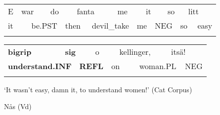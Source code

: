 \begin{tabular}{llllllllllllllll}
\lsptoprule
E & \multicolumn{2}{l}{war

} & \multicolumn{2}{l}{do

} & \multicolumn{2}{l}{fanta

} & \multicolumn{2}{l}{me

} & \multicolumn{2}{l}{it

} & \multicolumn{2}{l}{so

} & \multicolumn{2}{l}{litt

} & \\
\multicolumn{2}{l}{it

} & \multicolumn{2}{l}{be.PST

} & \multicolumn{2}{l}{then

} & \multicolumn{2}{l}{devil\_take

} & \multicolumn{2}{l}{me

} & \multicolumn{2}{l}{NEG

} & \multicolumn{2}{l}{so

} & \multicolumn{2}{l}{easy

}\\
\lspbottomrule
\end{tabular}

\begin{tabular}{llllllllll}
\lsptoprule
{\bfseries bigrip} & \multicolumn{2}{l}{{\bfseries sig}

} & \multicolumn{2}{l}{o

} & \multicolumn{2}{l}{kellinger,

} & \multicolumn{2}{l}{itsä!

} & \\
\multicolumn{2}{l}{{\bfseries understand.INF}

} & \multicolumn{2}{l}{{\bfseries REFL}

} & \multicolumn{2}{l}{on

} & \multicolumn{2}{l}{woman.PL

} & \multicolumn{2}{l}{NEG

}\\
\lspbottomrule
\end{tabular}

\begin{styleTranslation}
 ‘It wasn’t easy, damn it, to understand women!’ (Cat Corpus)

\end{styleTranslation}

\begin{listWWNumileveli}
\item {}

\begin{styleExample}
Nås (Vd)

\end{styleExample}

\end{listWWNumileveli}

